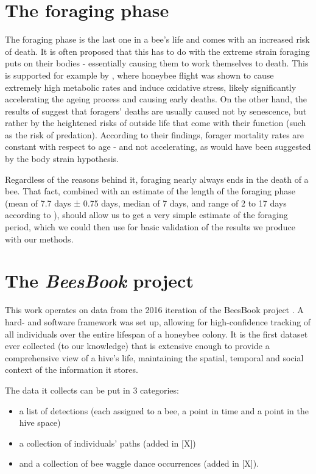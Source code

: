 \section{The foraging phase}
The foraging phase is the last one in a bee’s life and comes with an increased
risk of death. It is often proposed that this has to do with the extreme strain
foraging puts on their bodies - essentially causing them to work themselves to
death. This is supported for example by \citep{williams_age_2008},
where honeybee flight was shown to cause extremely high metabolic
rates and induce oxidative stress, likely significantly accelerating the ageing
process and causing early deaths. On the other hand, the results of
\citep{visscher_survivorship_1997} suggest that foragers’ deaths are usually
caused not by senescence, but rather by the heightened risks of outside life
that come with their function (such as the risk of predation). According to
their findings, forager mortality rates are constant with respect to age - and
not accelerating, as would have been suggested by the body strain hypothesis. 

Regardless of the reasons behind it, foraging nearly always ends in the death of
a bee. That fact, combined with an estimate of the length of the foraging phase
(mean of 7.7 days ± 0.75 days, median of 7 days, and range of 2 to 17 days
according to \citep{visscher_survivorship_1997}), should allow us to get a very
simple estimate of the foraging period, which we could then use for basic 
validation of the results we produce with our methods.



\section{The \textit{BeesBook} project}
This work operates on data from the 2016 iteration of the BeesBook project
\citep{wario_automatic_2015}. A hard- and software framework was set up, allowing
for high-confidence tracking of all individuals over the entire lifespan of a
honeybee colony. It is the first dataset ever collected (to our knowledge) that
is extensive enough to provide a comprehensive view of a hive’s life,
maintaining the spatial, temporal and social context of the information it
stores. 

The data it collects can be put in 3 categories: 
\begin{itemize}
    \item a list of detections (each assigned to a bee, a point in time and a
    point in the hive space) 
    \item a collection of individuals’ paths (added in [X])
    \item and a collection of bee waggle dance occurrences (added in [X]). 
\end{itemize}

